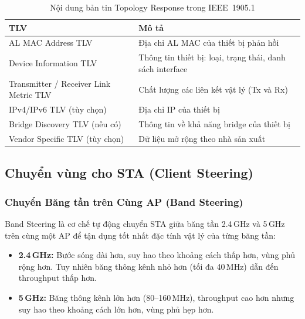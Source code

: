 \begin{table}[ht]
	\centering
	\caption{Nội dung bản tin Topology Response trong IEEE~1905.1}
	\begin{tabular}{|>{\raggedright\arraybackslash}m{5cm}|>{\raggedright\arraybackslash}m{8cm}|}
		\hline
		\textbf{TLV} & \textbf{Mô tả} \\
		\hline
		AL MAC Address TLV & Địa chỉ AL MAC của thiết bị phản hồi \\
		\hline
		Device Information TLV & Thông tin thiết bị: loại, trạng thái, danh sách interface \\
		\hline
		Transmitter / Receiver Link Metric TLV & Chất lượng các liên kết vật lý (Tx và Rx) \\
		\hline
		IPv4/IPv6 TLV (tùy chọn) & Địa chỉ IP của thiết bị \\
		\hline
		Bridge Discovery TLV (nếu có) & Thông tin về khả năng bridge của thiết bị \\
		\hline
		Vendor Specific TLV (tùy chọn) & Dữ liệu mở rộng theo nhà sản xuất \\
		\hline
	\end{tabular}
\end{table}


\subsection{Chuyển vùng cho STA (Client Steering)}

\subsubsection{Chuyển Băng tần trên Cùng AP (Band Steering)}

Band Steering là cơ chế tự động chuyển STA giữa băng tần 2.4\,GHz và 5\,GHz trên
cùng một AP để tận dụng tốt nhất đặc tính vật lý của từng băng tần:

\begin{itemize}
	\item \textbf{2.4\,GHz:} Bước sóng dài hơn, suy hao theo khoảng cách thấp hơn,
	vùng phủ rộng hơn. Tuy nhiên băng thông kênh nhỏ hơn (tối đa 40\,MHz) dẫn
	đến throughput thấp hơn.
	\item \textbf{5\,GHz:} Băng thông kênh lớn hơn (80--160\,MHz), throughput cao hơn
	nhưng suy hao theo khoảng cách lớn hơn, vùng phủ hẹp hơn.
\end{itemize}

